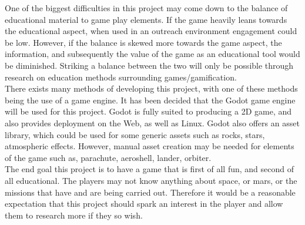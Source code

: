 \documentclass[11pt,fleqn,twoside]{article}
\begin{document}
One of the biggest difficulties in this project may come down to the balance of educational material to game play elements. If the game heavily leans towards the educational aspect, when used in an outreach environment engagement could be low. However, if the balance is skewed more towards the game aspect, the information, and subsequently the value of the game as an educational tool would be diminished. Striking a balance between the two will only be possible through research on education methods surrounding games/gamification.\\ 

There exists many methods of developing this project, with one of these methods being the use of a game engine. It has been decided that the Godot game engine will be used for this project. Godot is fully suited to producing a 2D game, and also provides deployment on the Web, as well as Linux. Godot also offers an asset library, which could be used for some generic assets such as rocks, stars, atmospheric effects. However,  manual asset creation may be needed for elements of the game such as, parachute, aeroshell, lander, orbiter. \\

The end goal this project is to have a game that is first of all fun, and second of all educational. The players may not know anything about space, or mars, or the missions that have and are being carried out. Therefore it would be a reasonable expectation that this project should spark an interest in the player and allow them to research more if they so wish. 



\end{document}
